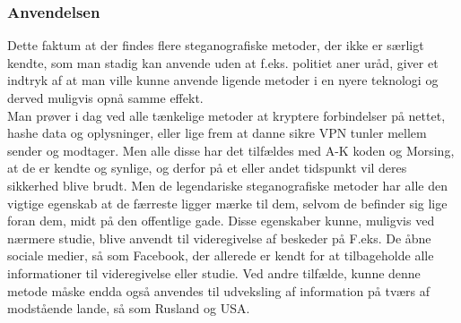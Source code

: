 \subsubsection{Anvendelsen}
Dette faktum at der findes flere steganografiske metoder, der ikke er særligt kendte, som man stadig kan anvende uden at f.eks. politiet aner uråd, giver et indtryk af at man ville kunne anvende ligende metoder i en nyere teknologi og derved muligvis opnå samme effekt. \\
Man prøver i dag ved alle tænkelige metoder at kryptere forbindelser på nettet, hashe data og oplysninger, eller lige frem at danne sikre VPN tunler mellem sender og modtager. Men alle disse har det tilfældes med A-K koden og Morsing, at de er kendte og synlige, og derfor på et eller andet tidspunkt vil deres sikkerhed blive brudt. Men de legendariske steganografiske metoder har alle den vigtige egenskab at de færreste ligger mærke til dem, selvom de befinder sig lige foran dem, midt på den offentlige gade. Disse egenskaber kunne, muligvis ved nærmere studie, blive anvendt til videregivelse af beskeder på F.eks. De åbne sociale medier, så som Facebook, der allerede er kendt for at tilbageholde alle informationer til videregivelse eller studie. Ved andre tilfælde, kunne denne metode måske endda også anvendes til udveksling af information på tværs af modstående lande, så som Rusland og USA.

